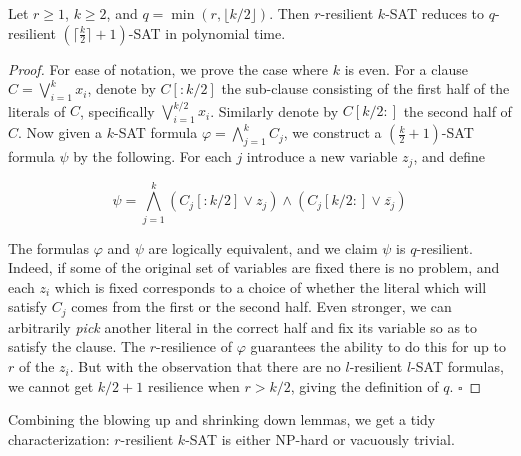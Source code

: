 \documentclass{llncs}
\begin{document}
\begin{lemma}
\label{lemma:down}
Let $r \geq 1$,  $k \geq 2$, and $q = \min(r, \lfloor k/2 \rfloor)$. Then
$r$-resilient $k$-SAT reduces to $q$-resilient $(\lceil \frac{k}{2} \rceil +
1)$-SAT in polynomial time.

\end{lemma}
\begin{proof}

For ease of notation, we prove the case where $k$ is even. For a clause $C =
\bigvee_{i=1}^k x_i$, denote by $C[:k/2]$ the sub-clause consisting of the
first half of the literals of $C$, specifically $\bigvee_{i=1}^{k/2} x_i$.
Similarly denote by $C[k/2:]$ the second half of $C$. Now given a $k$-SAT
formula $\varphi = \bigwedge_{j=1}^k C_j$, we construct a $(\frac{k}{2} +
1)$-SAT formula $\psi$ by the following. For each $j$ introduce a new variable
$z_j$, and  define

\[
   \psi = \bigwedge_{j=1}^k (C_j[:k/2] \vee z_j) \wedge (C_j[k/2:] \vee
\overline{z_j}) 
\]

The formulas $\varphi$ and $\psi$ are logically equivalent, and we claim $\psi$
is $q$-resilient. Indeed, if some of the original set of variables are fixed
there is no problem, and each $z_i$ which is fixed corresponds to a choice of
whether the literal which will satisfy $C_j$ comes from the first or the second
half. Even stronger, we can arbitrarily \emph{pick} another literal in the
correct half and fix its variable so as to satisfy the clause. The
$r$-resilience of $\varphi$ guarantees the ability to do this for up to $r$ of
the $z_i$. But with the observation that there are no $l$-resilient $l$-SAT
formulas, we cannot get $k/2 + 1$ resilience when $r > k/2$,
giving the definition of $q$.
\hfill $\square$
\end{proof}

Combining the blowing up and shrinking down lemmas, we get a tidy
characterization: $r$-resilient $k$-SAT is either NP-hard or vacuously trivial.
\end{document}
